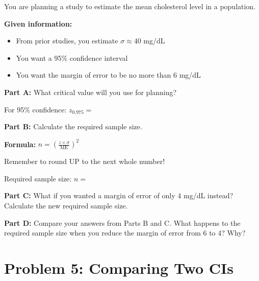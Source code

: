 \documentclass[11pt]{article}
\begin{document}
You are planning a study to estimate the mean cholesterol level in a population.

\vspace{6pt}

\textbf{Given information:}
\begin{itemize}
\item From prior studies, you estimate $\sigma \approx 40$ mg/dL
\item You want a 95\% confidence interval
\item You want the margin of error to be no more than 6 mg/dL
\end{itemize}

\vspace{6pt}

\textbf{Part A:} What critical value will you use for planning?

\vspace{0.3cm}

For 95\% confidence: $z_{0.975} = $

\vspace{1.5cm}

\textbf{Part B:} Calculate the required sample size.

\vspace{0.3cm}

\textbf{Formula:} $n = \left(\frac{z \times \sigma}{\text{ME}}\right)^2$

\vspace{3cm}

Remember to round UP to the next whole number!

\vspace{0.3cm}

Required sample size: $n = $

\vspace{1.5cm}

\textbf{Part C:} What if you wanted a margin of error of only 4 mg/dL instead? Calculate the new required sample size.

\vspace{3cm}

\textbf{Part D:} Compare your answers from Parts B and C. What happens to the required sample size when you reduce the margin of error from 6 to 4? Why?

\vspace{3cm}

\newpage

\section{Problem 5: Comparing Two CIs}
\end{document}
